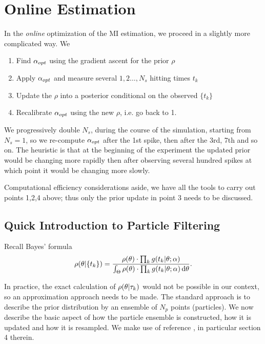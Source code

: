 \documentclass{article}
\begin{document}
\clearpage

\section{Online Estimation}
\label{sec:online_estimation} 

In the {\sl online} optimization of the MI estimation, we proceed in a
slightly more complicated way. We 

\begin{enumerate}
  \item Find ${{\alpha}_{opt} }$ using the gradient ascent for the prior $\rho$
  \item Apply ${{\alpha}_{opt} }$ and measure several $1,2\ldots,N_{s}$ hitting times
  $t_k$
  \item Update the $\rho$ into a posterior conditional on the observed $\{t_k\}$
  \item Recalibrate ${{\alpha}_{opt} }$ using the new $\rho$, i.e. go back to 1. 
\end{enumerate}

We progressively double $N_s$, during the course of the simulation, starting
from $N_s=1$, so we re-compute ${{\alpha}_{opt} }$ after the 1st spike, then after the 3rd, 7th and so on. 
The heuristic is that at the beginning of the experiment the
updated prior would be changing more rapidly then after observing several
hundred spikes at which point it would be changing more slowly.

Computational efficiency considerations aside, we have all the tools to carry out points
1,2,4 above; thus only the prior update in point 3 needs to be discussed. 

\subsection{Quick Introduction to Particle Filtering}
\label{sec:intro_to_particle_filtering}
Recall Bayes' formula
$$
\rho({\theta}| \{t_k\} ) = 
\frac{  \rho({\theta}) \cdot \prod_k g(t_k|{\theta} ; {\alpha}) }
	 { \int_{\Theta}  \rho({\theta}) \cdot \prod_k g(t_k|{\theta} ; {\alpha})  \, \mathrm{d} {\theta}}.
$$

In practice, the exact calculation of $\rho({\theta}|{\tau}_k)$ would not be possible in our
context, so an approximation approach needs to be made. The standard approach is
to describe the prior distribution by an ensemble of $N_p$
points (particles). We now describe the basic aspect of how the particle
ensemble is constructed, how it is updated and how it is resampled. We make use of
reference \cite{Granade2012}, in particular section 4 therein.
\end{document}
